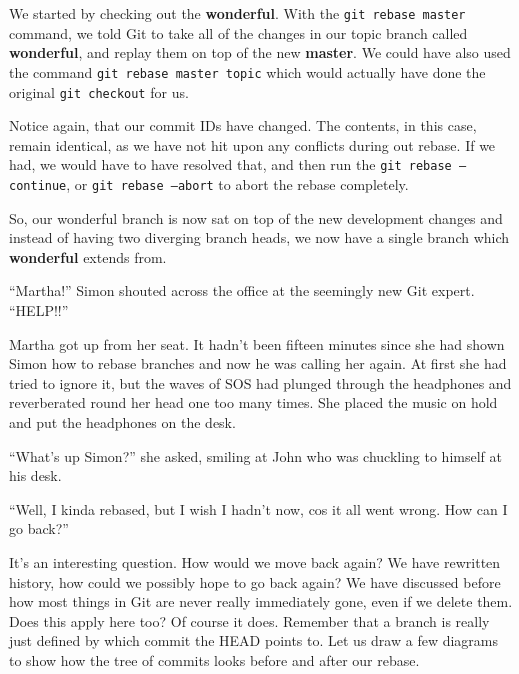 We started by checking out the \textbf{wonderful}.
With the \texttt{git rebase master} command, we told Git to take all of the changes in our topic branch called \textbf{wonderful}, and replay them on top of the new \textbf{master}.
We could have also used the command \texttt{git rebase master topic} which would actually have done the original \texttt{git checkout} for us.

Notice again, that our commit IDs have changed.
The contents, in this case, remain identical, as we have not hit upon any conflicts during out rebase.
If we had, we would have to have resolved that, and then run the \texttt{git rebase --continue}, or \texttt{git rebase --abort} to abort the rebase completely.

So, our wonderful branch is now sat on top of the new development changes and instead of having two diverging branch heads, we now have a single branch which \textbf{wonderful} extends from.

\begin{trenches}
``Martha!'' Simon shouted across the office at the seemingly new Git expert.
``HELP!!''

Martha got up from her seat.
It hadn't been fifteen minutes since she had shown Simon how to rebase branches and now he was calling her again.
At first she had tried to ignore it, but the waves of SOS had plunged through the headphones and reverberated round her head one too many times.
She placed the music on hold and put the headphones on the desk.

``What's up Simon?'' she asked, smiling at John who was chuckling to himself at his desk.

``Well, I kinda rebased, but I wish I hadn't now, cos it all went wrong. How can I go back?''
\end{trenches}

It's an interesting question.
How would we move back again? We have rewritten history, how could we possibly hope to go back again? We have discussed before how most things in Git are never really immediately gone, even if we delete them.
Does this apply here too? Of course it does.
Remember that a branch is really just defined by which commit the HEAD points to.
Let us draw a few diagrams to show how the tree of commits looks before and after our rebase.

